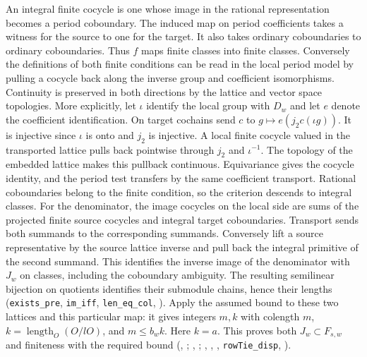 An integral finite cocycle is one whose image in the rational
representation becomes a period coboundary. The induced map on period
coefficients takes a witness for the source to one for the target.
It also takes ordinary coboundaries to ordinary coboundaries. Thus $f$
maps finite classes into finite classes. Conversely the definitions of
both finite conditions can be read in the local period model by pulling
a cocycle back along the inverse group and coefficient isomorphisms.
Continuity is preserved in both directions by the lattice and vector
space topologies. More explicitly, let $\iota$ identify the local group with $D_w$ and
let $e$ denote the coefficient identification. On target cochains send
$c$ to $g\mapsto e(j_2c(\iota g))$. It is injective since $\iota$ is
onto and $j_2$ is injective. A local finite cocycle valued in the
transported lattice pulls back pointwise through $j_2$ and
$\iota^{-1}$. The topology of the embedded lattice makes this
pullback continuous. Equivariance gives the cocycle identity, and the
period test transfers by the same coefficient transport. Rational
coboundaries belong to the finite condition, so the criterion descends
to integral classes. For the denominator, the image cocycles on the
local side are sums of the projected finite source cocycles and
integral target coboundaries. Transport sends both summands to the
corresponding summands. Conversely lift a source representative by
the source lattice inverse and pull back the integral primitive of
the second summand. This identifies the inverse image of the
denominator with $J_w$ on classes, including the coboundary
ambiguity. The resulting semilinear bijection on quotients identifies
their submodule chains, hence their lengths
(\nolinkurl{exists_pre}, \nolinkurl{im_iff}, \nolinkurl{len_eq_col},
). Apply the assumed
 bound to these two lattices and this particular map:
it gives integers $m,k$ with colength $m$, $k=\operatorname{length}_O(O/lO)$,
and $m\le b_w k$. Here $k=a$. This proves both $J_w\subset F_{s,w}$
and finiteness with the required bound
(, ;
, ;
, , ,
\nolinkurl{rowTie_disp},
).

